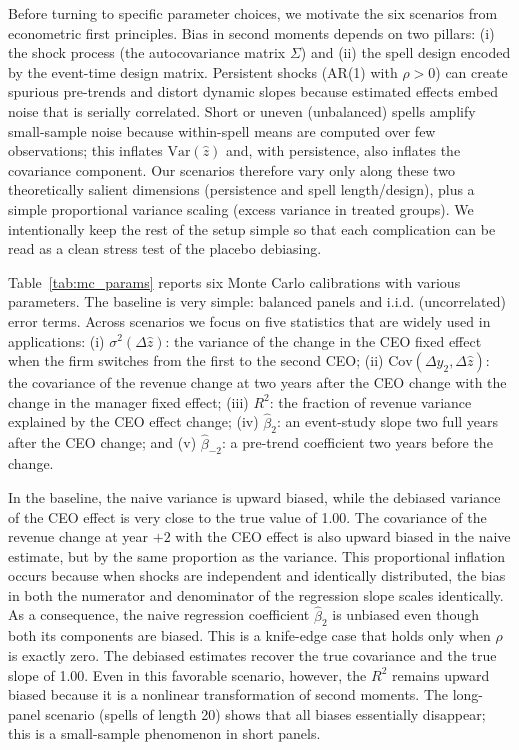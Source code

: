 \documentclass[11pt,a4paper]{article}
\newcommand{\Var}{\text{Var}}
\begin{document}
Before turning to specific parameter choices, we motivate the six scenarios from econometric first principles. Bias in second moments depends on two pillars: (i) the shock process (the autocovariance matrix \(\Sigma\)) and (ii) the spell design encoded by the event-time design matrix. Persistent shocks (AR(1) with \(\rho>0\)) can create spurious pre-trends and distort dynamic slopes because estimated effects embed noise that is serially correlated. Short or uneven (unbalanced) spells amplify small-sample noise because within-spell means are computed over few observations; this inflates \(\Var(\hat z)\) and, with persistence, also inflates the covariance component. Our scenarios therefore vary only along these two theoretically salient dimensions (persistence and spell length/design), plus a simple proportional variance scaling (excess variance in treated groups). We intentionally keep the rest of the setup simple so that each complication can be read as a clean stress test of the placebo debiasing.

Table~\ref{tab:mc_params} reports six Monte Carlo calibrations with various parameters. The baseline is very simple: balanced panels and i.i.d. (uncorrelated) error terms. Across scenarios we focus on five statistics that are widely used in applications: (i) $\sigma^2(\Delta \hat z)$: the variance of the change in the CEO fixed effect when the firm switches from the first to the second CEO; (ii) $ \mathrm{Cov}(\Delta y_2, \Delta \hat z)$: the covariance of the revenue change at two years after the CEO change with the change in the manager fixed effect; (iii) $ R^2$: the fraction of revenue variance explained by the CEO effect change; (iv) $\hat \beta_2$: an event-study slope two full years after the CEO change; and (v)  $\hat \beta_{-2}$: a pre-trend coefficient two years before the change.

In the baseline, the naive variance is upward biased, while the debiased variance of the CEO effect is very close to the true value of 1.00. The covariance of the revenue change at year $+2$ with the CEO effect is also upward biased in the naive estimate, but by the same proportion as the variance. This proportional inflation occurs because when shocks are independent and identically distributed, the bias in both the numerator and denominator of the regression slope scales identically. As a consequence, the naive regression coefficient $\hat\beta_2$ is unbiased even though both its components are biased. This is a knife-edge case that holds only when $\rho$ is exactly zero. The debiased estimates recover the true covariance and the true slope of 1.00. Even in this favorable scenario, however, the $R^2$ remains upward biased because it is a nonlinear transformation of second moments. The long-panel scenario (spells of length 20) shows that all biases essentially disappear; this is a small-sample phenomenon in short panels.
\end{document}
